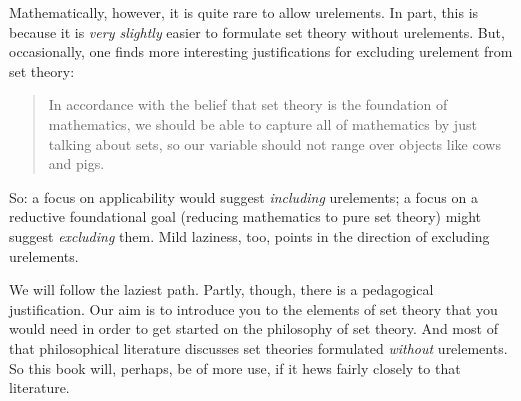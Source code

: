 \documentclass[../../../include/open-logic-section]{subfiles}
\begin{document}
Mathematically, however, it is quite rare to allow urelements. In
part, this is because it is \emph{very slightly} easier to formulate
set theory without urelements. But, occasionally, one finds more
interesting justifications for excluding urelement from set theory:
\begin{quote}
	In accordance with the belief that set theory is the foundation of
	mathematics, we should be able to capture all of mathematics by
	just talking about sets, so our variable should not range over
	objects like cows and pigs. 
	\citep[p.~8]{Kunen1980}
\end{quote}
So: a focus on applicability would suggest \emph{including}
urelements; a focus on a reductive foundational goal (reducing
mathematics to pure set theory) might suggest \emph{excluding} them.
Mild laziness, too, points in the direction of excluding urelements. 

We will follow the laziest path. Partly, though, there is a
pedagogical justification. Our aim is to introduce you to the elements
of set theory that you would need in order to get started on the
philosophy of set theory. And most of that philosophical literature
discusses set theories formulated \emph{without} urelements. So this
book will, perhaps, be of more use, if it hews fairly closely to that
literature.
\end{document}
